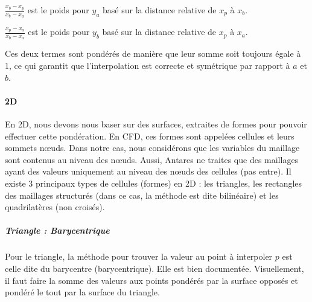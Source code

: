         \( \frac{x_b - x_p}{x_b - x_a} \) est le poids pour \( y_a \) basé sur la distance relative de \( x_p \) à \( x_b \).

        \( \frac{x_p - x_a}{x_b - x_a} \) est le poids pour \( y_b \) basé sur la distance relative de \( x_p \) à \( x_a \).\vspace{0.5cm}

Ces deux termes sont pondérés de manière que leur somme soit toujours égale à 1, ce
qui garantit que l'interpolation est correcte et symétrique par rapport à \( a \) et \( b \).\vspace{0.5cm}


\paragraph{2D}

En 2D, nous devons nous baser sur des surfaces, extraites de formes pour pouvoir effectuer cette pondération. En CFD, ces formes sont appelées cellules et leurs sommets nœuds. Dans notre cas, nous considérons que les variables du maillage sont contenus au niveau des nœuds. Aussi, Antares ne traites que des maillages ayant des valeurs uniquement au niveau des nœuds des cellules (pas entre).
Il existe 3 principaux types de cellules (formes) en 2D : les triangles, les rectangles des maillages structurés (dans ce cas, la méthode est dite bilinéaire) et les quadrilatères (non croisés).

\subparagraph{Triangle : Barycentrique}

Pour le triangle, la méthode pour trouver la valeur au point à interpoler \( p \) est celle dite du barycentre (barycentrique).
Elle est bien documentée. Visuellement, il faut faire la somme des valeurs aux points pondérés par la surface opposés et pondéré le tout par la surface du triangle.

